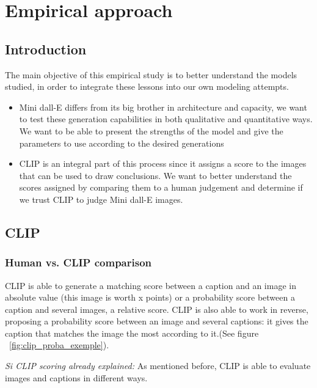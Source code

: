 \documentclass{article}
\begin{document}
\pagebreak

\section{Empirical approach}

\subsection{Introduction}

The main objective of this empirical study is to better understand the models studied, in order to integrate these lessons into our own modeling attempts.

\begin{itemize}
    \item Mini dall-E differs from its big brother in architecture and capacity, we want to test these generation capabilities in both qualitative and quantitative ways. We want to be able to present the strengths of the model and give the parameters to use according to the desired generations
    \item CLIP is an integral part of this process since it assigns a score to the images that can be used to draw conclusions. We want to better understand the scores assigned by comparing them to a human judgement and determine if we trust CLIP to judge Mini dall-E images.
\end{itemize}

\subsection{CLIP}



\subsubsection{Human vs. CLIP comparison}

CLIP is able to generate a matching score between a caption and an image in absolute value (this image is worth x points) or a probability score between a caption and several images, a relative score.
CLIP is also able to work in reverse, proposing a probability score between an image and several captions: it gives the caption that matches the image the most according to it.(See figure ~\ref{fig:clip_proba_exemple}).

\textit{Si CLIP scoring already explained:} As mentioned before, CLIP is able to evaluate images and captions in different ways.
\end{document}
